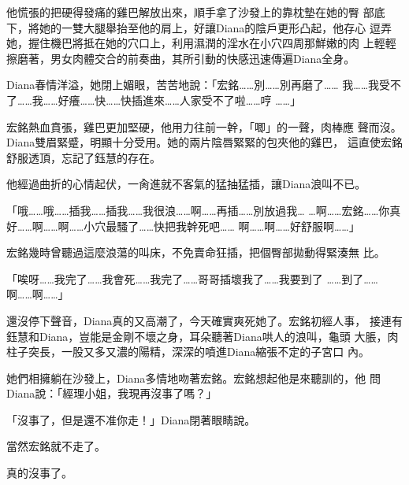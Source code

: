 他慌張的把硬得發痛的雞巴解放出來，順手拿了沙發上的靠枕墊在她的臀
部底下，將她的一雙大腿舉抬至他的肩上，好讓Diana的陰戶更形凸起，他存心
逗弄她，握住機巴將抵在她的穴口上，利用濕潤的淫水在小穴四周那鮮嫩的肉
上輕輕擦磨著，男女肉體交合的前奏曲，其所引動的快感迅速傳遍Diana全身。

Diana春情洋溢，她閉上媚眼，苦苦地說：「宏銘……別……別再磨了……
我……我受不了……我……好癢……快……快插進來……人家受不了啦……哼
……」

宏銘熱血賁張，雞巴更加堅硬，他用力往前一幹，「唧」的一聲，肉棒應
聲而沒。Diana雙眉緊蹙，明顯十分受用。她的兩片陰唇緊緊的包夾他的雞巴，
這直使宏銘舒服透頂，忘記了鈺慧的存在。

他經過曲折的心情起伏，一肏進就不客氣的猛抽猛插，讓Diana浪叫不已。

「哦……哦……插我……插我……我很浪……啊……再插……別放過我…
…啊……宏銘……你真好……啊……啊……小穴最騷了……快把我幹死吧……
啊……啊……好舒服啊……」

宏銘幾時曾聽過這麼浪蕩的叫床，不免賣命狂插，把個臀部拋動得緊湊無
比。

「唉呀……我完了……我會死……我完了……哥哥插壞我了……我要到了
……到了……啊……啊……」

還沒停下聲音，Diana真的又高潮了，今天確實爽死她了。宏銘初經人事，
接連有鈺慧和Diana，豈能是金剛不壞之身，耳朵聽著Diana哄人的浪叫，龜頭
大脹，肉柱子突長，一股又多又濃的陽精，深深的噴進Diana縮張不定的子宮口
內。

她們相擁躺在沙發上，Diana多情地吻著宏銘。宏銘想起他是來聽訓的，他
問Diana說：「經理小姐，我現再沒事了嗎？」

「沒事了，但是還不准你走！」Diana閉著眼睛說。

當然宏銘就不走了。

真的沒事了。










